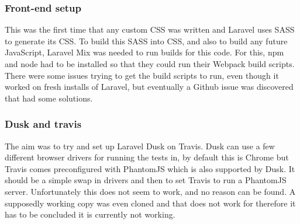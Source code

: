 \subsubsection{Front-end setup}
This was the first time that any custom CSS was written and Laravel uses SASS to generate its CSS. To build this SASS into CSS, and also to build any future JavaScript, Laravel Mix was needed to run builds for this code. For this, npm and node had to be installed so that they could run their Webpack build scripts. There were some issues trying to get the build scripts to run, even though it worked on fresh installs of Laravel, but eventually a Github issue was discovered that had some solutions\cite{broken-mix}.
\subsubsection{Dusk and travis}
The aim was to try and set up Laravel Dusk on Travis. Dusk can use a few different browser drivers for running the tests in, by default this is Chrome but Travis comes preconfigured with PhantomJS which is also supported by Dusk. It should be a simple swap in drivers and then to set Travis to run a PhantomJS server. Unfortunately this does not seem to work, and no reason can be found. A supposedly working copy was even cloned and that does not work for therefore it has to be concluded it is currently not working.
\newpage
